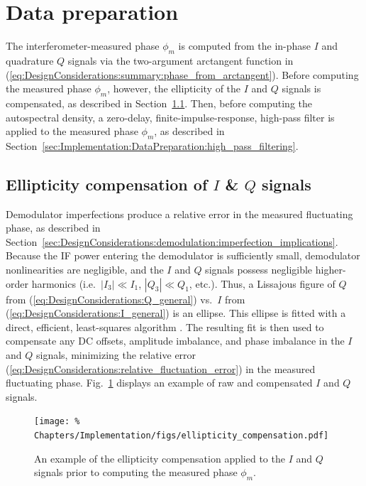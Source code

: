 \section{Data preparation}
\label{sec:Implementation:DataPreparation}
The interferometer-measured phase $\phi_m$
is computed from the in-phase $I$ and quadrature $Q$ signals
via the two-argument arctangent function in
(\ref{eq:DesignConsiderations:summary:phase_from_arctangent}).
Before computing the measured phase $\phi_m$, however,
the ellipticity of the $I$ and $Q$ signals is compensated, as described in
Section~\ref{sec:Implementation:DataPreparation:ellipticity_compensation}.
Then, before computing the autospectral density,
a zero-delay, finite-impulse-response, high-pass filter
is applied to the measured phase $\phi_m$, as described in
Section~\ref{sec:Implementation:DataPreparation:high_pass_filtering}.


\subsection{Ellipticity compensation of $I$ \& $Q$ signals}
\label{sec:Implementation:DataPreparation:ellipticity_compensation}
Demodulator imperfections produce a relative error
in the measured fluctuating phase, as described in
Section~\ref{sec:DesignConsiderations:demodulation:imperfection_implications}.
Because the IF power entering the demodulator is sufficiently small,
demodulator nonlinearities are negligible, and
the $I$ and $Q$ signals possess negligible higher-order harmonics
(i.e.\ $|I_3| \ll I_1$, $|Q_3| \ll Q_1$, etc.).
Thus, a Lissajous figure of $Q$ from
(\ref{eq:DesignConsiderations:Q_general})
vs.\ $I$ from (\ref{eq:DesignConsiderations:I_general})
is an ellipse.
This ellipse is fitted with a direct, efficient, least-squares algorithm
\cite{fitzgibbon_ieee99,vanforeest_ellipse_fitting}.
The resulting fit is then used to compensate
any DC offsets, amplitude imbalance, and phase imbalance
in the $I$ and $Q$ signals,
minimizing the relative error
(\ref{eq:DesignConsiderations:relative_fluctuation_error})
in the measured fluctuating phase.
Fig.~\ref{fig:Implementation:ellipticity_compensation}
displays an example of raw and compensated $I$ and $Q$ signals.

\begin{figure}
  \centering
  \texttt{[image: \%
    Chapters/Implementation/figs/ellipticity\_compensation.pdf]}
  \caption[Ellipticity compensation of the $I$ and $Q$ signals]{%
    An example of the ellipticity compensation
    applied to the $I$ and $Q$ signals
    prior to computing the measured phase $\phi_m$.
  }
\label{fig:Implementation:ellipticity_compensation}
\end{figure}


